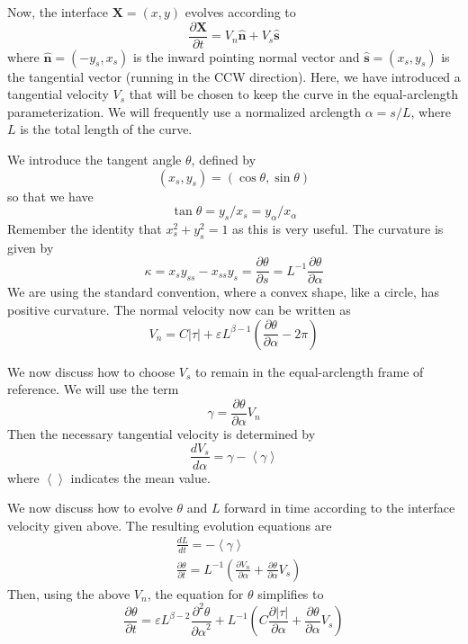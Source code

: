 \documentclass[11pt]{article}
\newcommand{\pd}[2]    { \frac{\partial #1} {\partial #2} }
\newcommand{\ppd}[2]  { \frac{\partial^2 #1}{{\partial #2}^2} }
\newcommand{\td}[2] { \frac{d #1} { d #2 } }
\newcommand{\bvec}[1]{\ensuremath{\boldsymbol{#1}}}
\newcommand{\abs}[1]{\left| #1 \right|}
\newcommand{\mean}[1]{\left< #1 \right>}
\newcommand{\nhat}{\hat{\bvec{n}}}
\newcommand{\shat}{\hat{\bvec{s}}}
\newcommand{\eps}{\varepsilon}
\newcommand{\atau}{\abs{\tau}}
\newcommand{\X}{\bvec{X}}
\begin{document}
Now, the interface $\X = (x,y)$ evolves according to
\begin{equation}
\pd{\bvec{X}}{t} = V_n \nhat + V_s \shat
\end{equation}
where $\nhat = (-y_s, x_s)$ is the inward pointing normal vector and $\shat = (x_s, y_s)$ is the tangential vector (running in the CCW direction). Here, we have introduced a tangential velocity $V_s$ that will be chosen to keep the curve in the equal-arclength parameterization. We will frequently use a normalized arclength $\alpha = s/L$, where $L$ is the total length of the curve.

We introduce the tangent angle $\theta$, defined by
\begin{equation}
(x_s, y_s) = (\cos \theta, \sin \theta)
\end{equation}
so that we have
\begin{equation}
\tan \theta = y_s/x_s = y_\alpha / x_\alpha
\end{equation}
Remember the identity that $x_s^2 + y_s^2 = 1$ as this is very useful.
The curvature is given by
\begin{equation}
\kappa = x_s y_{ss} - x_{ss} y_s = \pd{\theta}{s} = L^{-1} \pd{\theta}{\alpha}
\end{equation}
We are using the standard convention, where a convex shape, like a circle, has positive curvature. The normal velocity now can be written as
\begin{equation}
\label{Vn2}
V_n = C \atau + \eps L^{\beta-1} \left(\pd{\theta}{\alpha} - 2 \pi \right)
\end{equation}

We now discuss how to choose $V_s$ to remain in the equal-arclength frame of reference. We will use the term
\begin{equation}
\gamma = \pd{\theta}{\alpha} V_n
\end{equation}
Then the necessary tangential velocity is determined by
\begin{equation}
\td{V_s}{\alpha} = \gamma - \mean{\gamma}
\end{equation}
where $\mean{}$ indicates the mean value.

We now discuss how to evolve $\theta$ and $L$ forward in time according to the interface velocity given above. The resulting evolution equations are
\begin{align}
& \td{L}{t} = - \mean{\gamma} \\
& \pd{\theta}{t} = L^{-1} \left( \pd{V_n}{\alpha} + \pd{\theta}{\alpha} V_s \right)
\end{align}
Then, using the above $V_n$, the equation for $\theta$ simplifies to
\begin{equation}
\label{thetaEvolve}
\pd{\theta}{t} = \eps L^{\beta-2} \ppd{\theta}{\alpha} + L^{-1} \left( C \pd{\atau}{\alpha} + \pd{\theta}{\alpha} V_s \right)
\end{equation}
\end{document}
